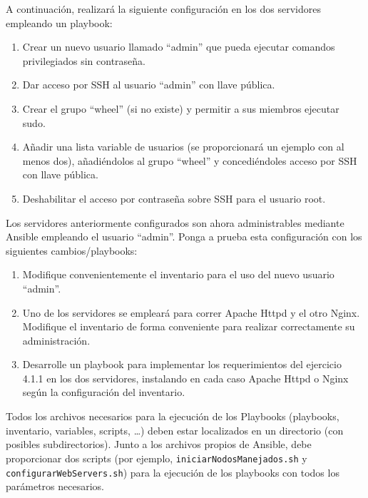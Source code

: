 A continuación, realizará la siguiente configuración en los dos servidores empleando un playbook:
\begin{enumerate}
  \item Crear un nuevo usuario llamado “admin” que pueda ejecutar comandos privilegiados sin contraseña.
  \item Dar acceso por SSH al usuario “admin” con llave pública.
  \item Crear el grupo “wheel” (si no existe) y permitir a sus miembros ejecutar sudo.
  \item Añadir una lista variable de usuarios (se proporcionará un ejemplo con al menos dos), añadiéndolos al grupo “wheel” y concediéndoles acceso por SSH con llave pública.
  \item Deshabilitar el acceso por contraseña sobre SSH para el usuario root.
\end{enumerate}

Los servidores anteriormente configurados son ahora administrables mediante Ansible empleando el usuario “admin”. Ponga a prueba esta configuración con los siguientes cambios/playbooks:
\begin{enumerate}
  \item Modifique convenientemente el inventario para el uso del nuevo usuario “admin”.
  \item Uno de los servidores se empleará para correr Apache Httpd y el otro Nginx. Modifique el inventario de forma conveniente para realizar correctamente su administración.
  \item Desarrolle un playbook para implementar los requerimientos del ejercicio 4.1.1 en los dos servidores, instalando en cada caso Apache Httpd o Nginx según la configuración del inventario.
\end{enumerate}

Todos los archivos necesarios para la ejecución de los Playbooks (playbooks, inventario, variables, scripts, …) deben estar localizados en un directorio (con posibles subdirectorios). Junto a los archivos propios de Ansible, debe proporcionar dos scripts (por ejemplo, \texttt{iniciarNodosManejados.sh} y \texttt{configurarWebServers.sh}) para la ejecución de los playbooks con todos los parámetros necesarios.


